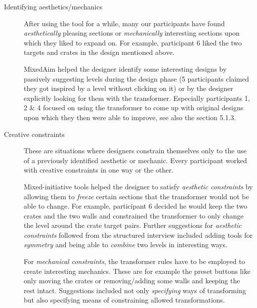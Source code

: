 \newpage
\begin{description}
\item[Identifying aesthetics/mechanics] After using the tool for a while, many our participants have found \textit{aesthetically} pleasing sections or \textit{mechanically} interesting sections upon which they liked to expand on. For example, participant 6 liked the two targets and crates in the design mentioned above.



MixedAim helped the designer identify some interesting designs by passively suggesting levels during the design phase (5 participants claimed they got inspired by a level without clicking on it) or by the designer explicitly looking for them with the transformer. Especially participants 1, 2 \& 4 focused on using the transformer to come up with original designs upon which they then were able to improve, see also the section 5.1.3. 

\item[Creative constraints] These are situations where designers constrain themselves only to the use of a previously identified aesthetic or mechanic. Every participant worked with creative constraints in one way or the other.

Mixed-initiative tools helped the designer to satisfy \textit{aesthetic constraints} by allowing them to \textit{freeze} certain sections that the transformer would not be able to change. For example, participant 6 decided he would keep the two crates and the two walls and constrained the transformer to only change the level around the crate target pairs. Further suggestions for \textit{aesthetic constraints} followed from the structured interview included adding tools for \textit{symmetry} and being able to \textit{combine} two levels in interesting ways.

For \textit{mechanical constraints}, the transformer rules have to be employed to create interesting mechanics. These are for example the preset buttons like only moving the crates or removing/adding some walls and keeping the rest intact. Suggestions included not only \textit{specifying} ways of transforming but also specifying means of constraining allowed transformations. 


\end{description}
